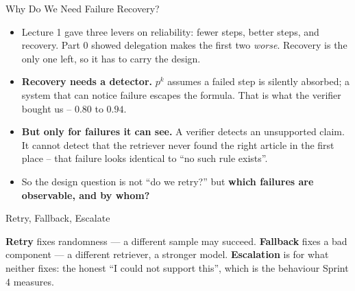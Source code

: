 \begin{frame}{Why Do We Need Failure Recovery?}
\begin{itemize}
  \item Lecture 1 gave three levers on reliability: fewer steps, better steps, and recovery. Part 0 showed delegation makes the first two \emph{worse}. Recovery is the only one left, so it has to carry the design.
  \pause
  \item \textbf{Recovery needs a detector.} $p^{k}$ assumes a failed step is silently absorbed; a system that can notice failure escapes the formula. That is what the verifier bought us -- $0.80$ to $0.94$.
  \pause
  \item \textbf{But only for failures it can see.} A verifier detects an unsupported claim. It cannot detect that the retriever never found the right article in the first place -- that failure looks identical to ``no such rule exists''.
  \pause
  \item So the design question is not ``do we retry?'' but \textbf{which failures are observable, and by whom?}
\end{itemize}
\end{frame}

\begin{frame}{Retry, Fallback, Escalate}
\centering
{}

\vspace{0.5em}
\footnotesize
\textbf{Retry} fixes randomness --- a different sample may succeed. \textbf{Fallback} fixes a bad
component --- a different retriever, a stronger model. \textbf{Escalation} is for what neither
fixes: the honest ``I could not support this'', which is the behaviour Sprint 4 measures.
\end{frame}

